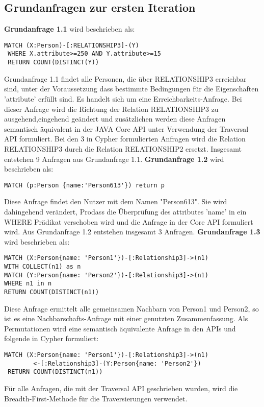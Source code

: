 \subsection{Grundanfragen zur ersten Iteration}
\textbf{Grundanfrage 1.1} wird beschrieben als:
\begin{Verbatim}[frame=single]
 MATCH (X:Person)-[:RELATIONSHIP3]-(Y) 
 WHERE X.attribute>=250 AND Y.attribute>=15  
 RETURN COUNT(DISTINCT(Y))
\end{Verbatim} 
Grundanfrage 1.1 findet alle Personen, die über RELATIONSHIP3 erreichbar sind, unter der Voraussetzung dass bestimmte Bedingungen für die Eigenschaften 'attribute' erfüllt sind. Es handelt sich um eine Erreichbarkeits-Anfrage. Bei dieser Anfrage wird die Richtung der Relation RELATIONSHIP3 zu ausgehend,eingehend  geändert und zusätzlichen werden diese Anfragen  semantisch äquivalent in der JAVA Core API unter Verwendung der Traversal API formuliert. Bei den 3 in Cypher formulierten Anfragen wird die Relation RELATIONSHIP3 durch die Relation RELATIONSHIP2 ersetzt. Insgesamt entstehen 9 Anfragen aus Grundanfrage 1.1. \newline 
\textbf{Grundanfrage 1.2} wird beschrieben als: 
\begin{Verbatim}[frame=single]
MATCH (p:Person {name:'Person613'}) return p
\end{Verbatim} 
Diese Anfrage findet den Nutzer mit dem Namen "Person613". Sie wird dahingehend verändert, Prodass die Überprüfung des attributes 'name' in ein WHERE Prädikat verschoben wird und die Anfrage  in der Core API formuliert wird. Aus Grundanfrage 1.2 entstehen insgesamt 3 Anfragen.\newline 
\textbf{Grundanfrage 1.3} wird beschrieben als: 
\begin{Verbatim}[frame=single]
MATCH (X:Person{name: 'Person1'})-[:Relationship3]->(n1) 
WITH COLLECT(n1) as n 
MATCH (Y:Person{name: 'Person2'})-[:Relationship3]->(n1) 
WHERE n1 in n
RETURN COUNT(DISTINCT(n1))
\end{Verbatim} 
Diese Anfrage ermittelt alle gemeinsamen Nachbarn von Person1 und Person2, so ist es eine Nachbarschafts-Anfrage mit einer genutzten Zusammenfassung. Als Permutationen wird eine semantisch äquivalente Anfrage in den APIs und folgende in Cypher formuliert:
\begin{Verbatim}[frame=single]
 MATCH (X:Person{name: 'Person1'})-[:Relationship3]->(n1)
 		<-[:Relationship3]-(Y:Person{name: 'Person2'}) 
 RETURN COUNT(DISTINCT(n1))
\end{Verbatim} 
Für alle Anfragen, die mit der Traversal API geschrieben wurden, wird die Breadth-First-Methode für die Traversierungen verwendet. 
